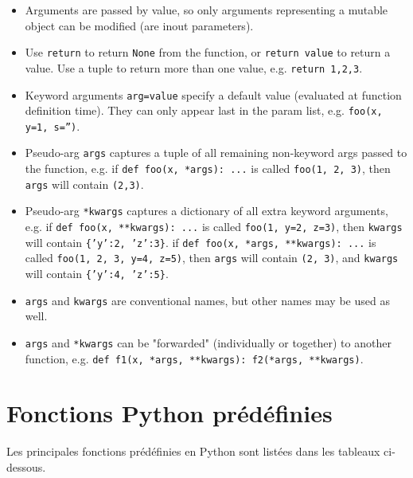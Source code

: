 \noindent\begin{itemize}
\item Arguments are passed by value, so only arguments representing a mutable object can be modified (are inout parameters).
\item Use {\tt return} to return {\tt None} from the function, or {\tt return value} to return a value. 
	Use a tuple to return more than one value, e.g. {\tt return 1,2,3}.
\item Keyword arguments {\tt arg=value} specify a default value (evaluated at function definition time). 
	They can only appear last in the param list, e.g. {\tt foo(x, y=1, s='')}.
\item Pseudo-arg {\tt *args} captures a tuple of all remaining non-keyword args passed to the function, 
	e.g. if {\tt def foo(x, *args): ...} is called {\tt foo(1, 2, 3)}, then {\tt args} will contain {\tt (2,3)}.
\item Pseudo-arg {\tt **kwargs} captures a dictionary of all extra keyword arguments, 
	e.g. if {\tt def foo(x, **kwargs): ...} is called {\tt foo(1, y=2, z=3)}, then {\tt kwargs} will contain {\tt \{'y':2, 'z':3\}}. 
	if {\tt def foo(x, *args, **kwargs): ...} is called {\tt foo(1, 2, 3, y=4, z=5)}, then {\tt args} will contain {\tt (2, 3)}, 
	and {\tt kwargs} will contain {\tt \{'y':4, 'z':5\}}.
\item {\tt args} and {\tt kwargs} are conventional names, but other names may be used as well.
\item {\tt *args} and {\tt **kwargs} can be "forwarded" (individually or together) to another function, e.g.
      {\tt def f1(x, *args, **kwargs): f2(*args, **kwargs)}.
\end{itemize}

\section{Fonctions {\sc Python} prédéfinies}\label{python:fonctions}
Les principales fonctions prédéfinies en {\sc Python} sont listées dans les tableaux
ci-dessous.

